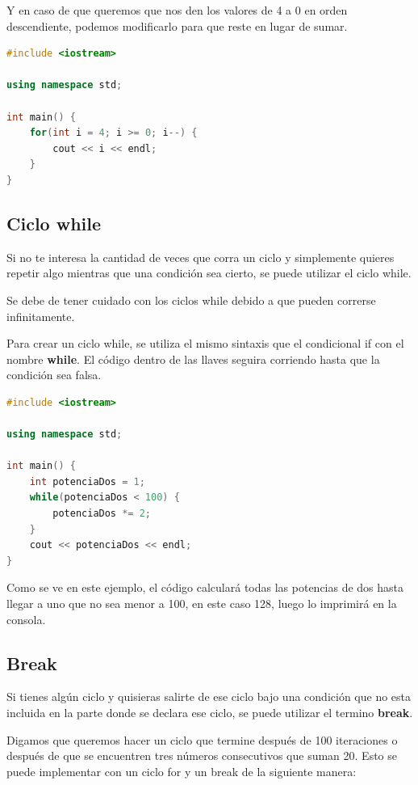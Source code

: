 \documentclass{article}
\begin{document}
Y en caso de que queremos que nos den los valores de 4 a 0 en orden descendiente, podemos modificarlo para que reste en lugar de sumar.

\begin{lstlisting}[language=C++, caption=Ciclo for]
#include <iostream>

using namespace std;

int main() {
    for(int i = 4; i >= 0; i--) {
        cout << i << endl;
    }
}
\end{lstlisting}

\subsection{Ciclo while}

Si no te interesa la cantidad de veces que corra un ciclo y simplemente quieres repetir algo mientras que una condición sea cierto, se puede utilizar el ciclo while.

Se debe de tener cuidado con los ciclos while debido a que pueden correrse infinitamente.

Para crear un ciclo while, se utiliza el mismo sintaxis que el condicional if con el nombre \textbf{while}. El código dentro de las llaves seguira corriendo hasta que la condición sea falsa.

\begin{lstlisting}[language=C++, caption=Ciclo while]
#include <iostream>

using namespace std;

int main() {
    int potenciaDos = 1;
    while(potenciaDos < 100) {
        potenciaDos *= 2;
    }
    cout << potenciaDos << endl;
}
\end{lstlisting}

Como se ve en este ejemplo, el código calculará todas las potencias de dos hasta llegar a uno que no sea menor a 100, en este caso 128, luego lo imprimirá en la consola.

\subsection{Break}

Si tienes algún ciclo y quisieras salirte de ese ciclo bajo una condición que no esta incluida en la parte donde se declara ese ciclo, se puede utilizar el termino \textbf{break}.

Digamos que queremos hacer un ciclo que termine después de 100 iteraciones o después de que se encuentren tres números consecutivos que suman 20. Esto se puede implementar con un ciclo for y un break de la siguiente manera:
\end{document}
